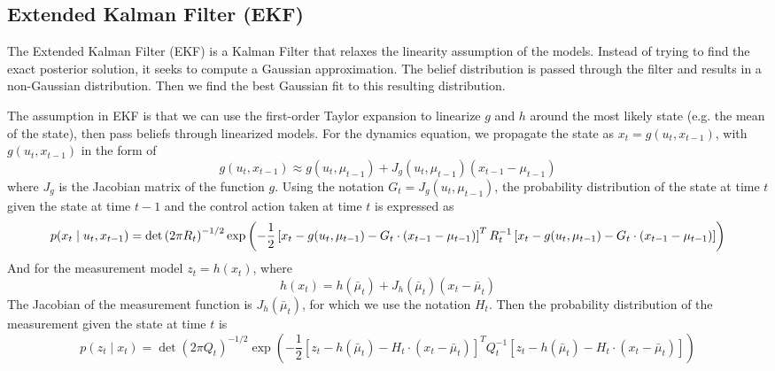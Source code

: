 \documentclass[twoside]{article}
\begin{document}
\subsection{Extended Kalman Filter (EKF)}

The Extended Kalman Filter (EKF) is a Kalman Filter that relaxes the linearity assumption of the models. Instead of trying to find the exact posterior solution, it seeks to compute a Gaussian approximation.  The belief distribution is passed through the filter and results in a non-Gaussian distribution. Then we find the best Gaussian fit to this resulting distribution.
\par
The assumption in EKF is that we can use the first-order Taylor expansion to linearize $g$ and $h$ around the most likely state (e.g. the mean of the state), then pass beliefs through linearized models. For the dynamics equation, we propagate the state as $x_t = g(u_t, x_{t-1})$, with $g(u_t, x_{t-1})$ in the form of
\begin{equation}
	g(u_t, x_{t-1}) \approx g(u_t, \mu_{t-1}) + J_g(u_t, \mu_{t-1})(x_{t-1}-\mu_{t-1})
\end{equation}
where $J_g$ is the Jacobian matrix of the function $g$. Using the notation $G_t = J_g(u_t, \mu_{t-1})$, the probability distribution of the state at time $t$ given the state at time $t-1$ and the control action taken at time $t$ is expressed as
\begin{equation}\footnotesize
p(x_t \mid u_t, x_{t-1}) = \det \left(2\pi R_t\right)^{-1/2} \exp \left(-\frac{1}{2}\left[x_t - g(u_t, \mu_{t-1}) - G_t\cdot (x_{t-1} - \mu_{t-1})\right]^T R_t^{-1} \left[x_t - g(u_t, \mu_{t-1}) - G_t\cdot(x_{t-1} - \mu_{t-1})\right]\right)
\end{equation}
And for the measurement model $z_t = h(x_t)$, where
\begin{equation}
	h(x_t) = h(\bar{\mu}_{t})+J_h(\bar{\mu}_{t})(x_t-\bar{\mu}_{t})
\end{equation}
The Jacobian of the measurement function is $J_h({\bar{\mu}_t})$, for which we use the notation $H_t$. Then the probability distribution of the measurement given the state at time $t$ is
\begin{equation}
p(z_t \mid x_t) = \det(2\pi Q_t)^{-1/2} \exp \left( -\frac{1}{2} \left[z_t - h(\bar{\mu}_t) - H_t \cdot (x_t - \bar{\mu}_t)\right]^T Q_t^{-1}\left[z_t - h(\bar{\mu}_t) - H_t \cdot (x_t - \bar{\mu}_t)\right]\right)
\end{equation}
\end{document}
